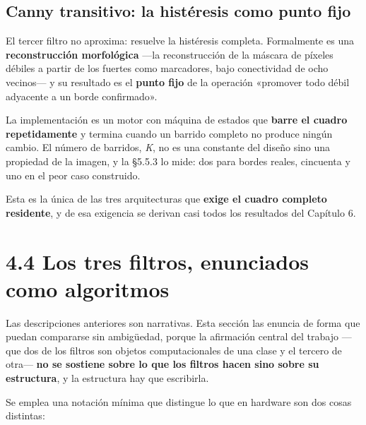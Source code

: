 \subsection{Canny transitivo: la histéresis como punto
fijo}\label{canny-transitivo-la-histuxe9resis-como-punto-fijo}

El tercer filtro no aproxima: resuelve la histéresis completa.
Formalmente es una \textbf{reconstrucción morfológica} ---la
reconstrucción de la máscara de píxeles débiles a partir de los fuertes
como marcadores, bajo conectividad de ocho vecinos--- y su resultado es
el \textbf{punto fijo} de la operación «promover todo débil adyacente a
un borde confirmado».

La implementación es un motor con máquina de estados que \textbf{barre
el cuadro repetidamente} y termina cuando un barrido completo no produce
ningún cambio. El número de barridos, \emph{K}, no es una constante del
diseño sino una propiedad de la imagen, y la §5.5.3 lo mide: dos para
bordes reales, cincuenta y uno en el peor caso construido.

Esta es la única de las tres arquitecturas que \textbf{exige el cuadro
completo residente}, y de esa exigencia se derivan casi todos los
resultados del Capítulo 6.

\section{4.4 Los tres filtros, enunciados como
algoritmos}\label{los-tres-filtros-enunciados-como-algoritmos}

Las descripciones anteriores son narrativas. Esta sección las enuncia de
forma que puedan compararse sin ambigüedad, porque la afirmación central
del trabajo ---que dos de los filtros son objetos computacionales de una
clase y el tercero de otra--- \textbf{no se sostiene sobre lo que los
filtros hacen sino sobre su estructura}, y la estructura hay que
escribirla.

Se emplea una notación mínima que distingue lo que en hardware son dos
cosas distintas:

